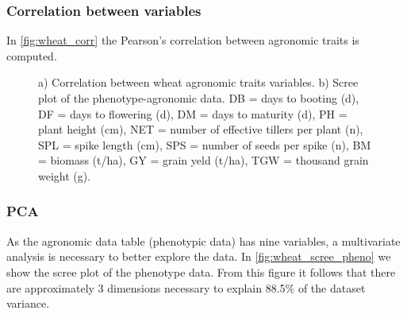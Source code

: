 \documentclass[a4paper,onecolumn,10pt]{article}
\begin{document}
\subsubsection{Correlation between variables}

In \cref{fig:wheat_corr} the Pearson's correlation between agronomic traits is computed.

\begin{figure}[!ht]
    \centering
    \caption{%
        a) Correlation between wheat agronomic traits variables.
        b) Scree plot of the phenotype-agronomic data.
        DB = days to booting (d),
        DF = days to flowering (d),
        DM = days to maturity (d),
        PH = plant height (cm),
        NET = number of effective tillers per plant (n),
        SPL = spike length (cm),
        SPS = number of seeds per spike (n),
        BM = biomass (t/ha),
        GY = grain yeld (t/ha),
        TGW = thousand grain weight (g).
    }
    \label{fig:wheat_corr_scree}
\end{figure}

\subsubsection{PCA}

As the agronomic data table (phenotypic data) has nine variables, a multivariate analysis is necessary to better explore the data.
In \cref{fig:wheat_scree_pheno} we show the scree plot of the phenotype data.
From this figure it follows that there are approximately 3 dimensions necessary to explain 88.5\% of the dataset variance.







\end{document}
